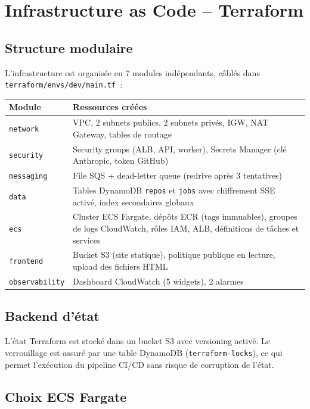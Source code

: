 \documentclass[11pt,a4paper]{article}
\newcommand{\code}[1]{\texttt{#1}}
\begin{document}
\section{Infrastructure as Code -- Terraform}

\subsection{Structure modulaire}

L'infrastructure est organis\'{e}e en 7 modules ind\'{e}pendants, c\^{a}bl\'{e}s dans \code{terraform/envs/dev/main.tf}~:

\begin{tabularx}{\linewidth}{lX}
\toprule
Module & Ressources cr\'{e}\'{e}es \\
\midrule
\code{network} & VPC, 2 subnets publics, 2 subnets priv\'{e}s, IGW, NAT Gateway, tables de routage \\
\code{security} & Security groups (ALB, API, worker), Secrets Manager (cl\'{e} Anthropic, token GitHub) \\
\code{messaging} & File SQS + dead-letter queue (redrive apr\`{e}s 3 tentatives) \\
\code{data} & Tables DynamoDB \code{repos} et \code{jobs} avec chiffrement SSE activ\'{e}, index secondaires globaux \\
\code{ecs} & Cluster ECS Fargate, d\'{e}p\^{o}ts ECR (tags immuables), groupes de logs CloudWatch, r\^{o}les IAM, ALB, d\'{e}finitions de t\^{a}ches et services \\
\code{frontend} & Bucket S3 (site statique), politique publique en lecture, upload des fichiers HTML \\
\code{observability} & Dashboard CloudWatch (5 widgets), 2 alarmes \\
\bottomrule
\end{tabularx}

\subsection{Backend d'\'{e}tat}

L'\'{e}tat Terraform est stock\'{e} dans un bucket S3 avec versioning activ\'{e}. Le verrouillage est assur\'{e} par une table DynamoDB (\code{terraform-locks}), ce qui permet l'ex\'{e}cution du pipeline CI/CD sans risque de corruption de l'\'{e}tat.

\subsection{Choix ECS Fargate}
\end{document}
